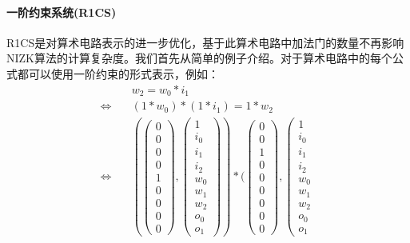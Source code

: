 \paragraph{一阶约束系统(R1CS)} R1CS是对算术电路表示的进一步优化，基于此算术电路中加法门的数量不再影响NIZK算法的计算复杂度。我们首先从简单的例子介绍。对于算术电路中的每个公式都可以使用一阶约束的形式表示，例如：
\begin{equation}
    \begin{split}
    &w_2 = w_0 * i_1 \\
    \Longleftrightarrow \quad &(1 * w_0) * (1 * i_1) = 1 * w_2 \\
    \Longleftrightarrow \quad &(
    \left( \begin{array}{ccc}
        0 \\ 0 \\ 0 \\ 0 \\ 1 \\ 0 \\ 0 \\ 0 \\ 0
        \end{array} \right), 
    \left( \begin{array}{ccc}
        1 \\ i_0 \\ i_1 \\ i_2 \\ w_0 \\ w_1 \\ w_2 \\ o_0 \\ o_1
        \end{array} \right) ) * (
    \left( \begin{array}{ccc}
        0 \\ 0 \\ 1 \\ 0 \\ 0 \\ 0 \\ 0 \\ 0 \\ 0
        \end{array} \right), 
    \left( \begin{array}{ccc}
        1 \\ i_0 \\ i_1 \\ i_2 \\ w_0 \\ w_1 \\ w_2 \\ o_0 \\ o_1

\end{array}
\end{split}
\end{equation}
